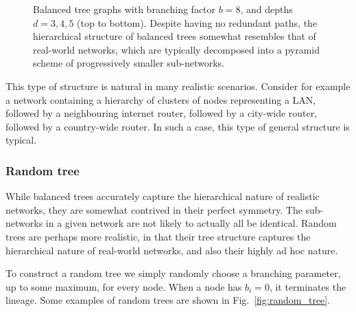 \documentclass[aps,rmp,twocolumn,amsmath,amssymb,nofootinbib,superscriptaddress]{revtex4}
\begin{document}
\begin{figure}[!htb]
\caption{Balanced tree graphs with branching factor $b=8$, and depths $d=3,4,5$ (top to bottom). Despite having no redundant paths, the hierarchical structure of balanced trees somewhat resembles that of real-world networks, which are typically decomposed into a pyramid scheme of progressively smaller sub-networks.} \label{fig:tree_example}
\end{figure}

This type of structure is natural in many realistic scenarios. Consider for example a network containing a hierarchy of clusters of nodes representing a LAN, followed by a neighbouring internet router, followed by a city-wide router, followed by a country-wide router. In such a case, this type of general structure is typical.

%
%

\subsubsection{Random tree}

While balanced trees accurately capture the hierarchical nature of realistic networks, they are somewhat contrived in their perfect symmetry. The sub-networks in a given network are not likely to actually all be identical. Random trees are perhaps more realistic, in that their tree structure captures the hierarchical nature of real-world networks, and also their highly ad hoc nature.

To construct a random tree we simply randomly choose a branching parameter, up to some maximum, for every node. When a node has \mbox{$b_i=0$}, it terminates the lineage. Some examples of random trees are shown in Fig.~\ref{fig:random_tree}.
\end{document}
